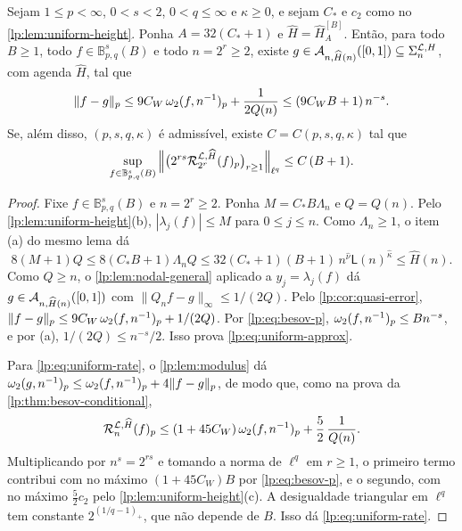 \documentclass[12pt,a4paper]{article}
\begin{document}
\begin{teorema}
\label{lp:thm:uniform}
Sejam $1\le p<\infty$, $0<s<2$, $0<q\le\infty$ e $\kappa\ge0$, e sejam $C_*$ e $c_2$ como no \cref{lp:lem:uniform-height}. Ponha $A=32(C_*+1)$ e $\widehat H=\widehat H^{[B]}_{A}$. Então, para todo $B\ge1$, todo $f\in\mathbb B^s_{p,q}(B)$ e todo $n=2^r\ge2$, existe $g\in\mathcal A_{n,\widehat H(n)}([0,1])\subseteq\Sigma_{n}^{\mathcal L,H}$, com agenda $\widehat H$, tal que
\begin{equation}
 \|f-g\|_p\le9C_W\,\omega_2(f,n^{-1})_{p}+\frac1{2Q(n)}\le(9C_WB+1)\,n^{-s}.
 \label{lp:eq:uniform-approx}
\end{equation}
Se, além disso, $(p,s,q,\kappa)$ é admissível, existe $C=C(p,s,q,\kappa)$ tal que
\begin{equation}
 \sup_{f\in\mathbb B^s_{p,q}(B)}\Big\|\big(2^{rs}\mathcal R^{\mathcal L,\widehat H}_{2^r}(f)_p\big)_{r\ge1}\Big\|_{\ell^q}\le C\,(B+1).
 \label{lp:eq:uniform-rate}
\end{equation}
\end{teorema}

\begin{proof}
Fixe $f\in\mathbb B^s_{p,q}(B)$ e $n=2^r\ge2$. Ponha $M=C_*B\Lambda_n$ e $Q=Q(n)$. Pelo \cref{lp:lem:uniform-height}(b), $|\lambda_j(f)|\le M$ para $0\le j\le n$. Como $\Lambda_n\ge1$, o item (a) do mesmo lema dá
\[
 8(M+1)Q\le8(C_*B+1)\Lambda_nQ\le32(C_*+1)(B+1)\,n^{\hat\nu}\mathsf L(n)^{\hat\kappa}\le\widehat H(n).
\]
Como $Q\ge n$, o \cref{lp:lem:nodal-general} aplicado a $y_j=\lambda_j(f)$ dá $g\in\mathcal A_{n,\widehat H(n)}([0,1])$ com $\|Q_nf-g\|_\infty\le1/(2Q)$. Pelo \cref{lp:cor:quasi-error}, $\|f-g\|_p\le9C_W\,\omega_2(f,n^{-1})_{p}+1/(2Q)$. Por \eqref{lp:eq:besov-p}, $\omega_2(f,n^{-1})_{p}\le Bn^{-s}$, e por (a), $1/(2Q)\le n^{-s}/2$. Isso prova \eqref{lp:eq:uniform-approx}.

Para \eqref{lp:eq:uniform-rate}, o \cref{lp:lem:modulus} dá $\omega_2(g,n^{-1})_{p}\le\omega_2(f,n^{-1})_{p}+4\|f-g\|_p$, de modo que, como na prova da \cref{lp:thm:besov-conditional},
\[
 \mathcal R^{\mathcal L,\widehat H}_{n}(f)_p\le(1+45C_W)\,\omega_2(f,n^{-1})_{p}+\frac52\,\frac1{Q(n)}.
\]
Multiplicando por $n^s=2^{rs}$ e tomando a norma de $\ell^q$ em $r\ge1$, o primeiro termo contribui com no máximo $(1+45C_W)B$ por \eqref{lp:eq:besov-p}, e o segundo, com no máximo $\tfrac52c_2$ pelo \cref{lp:lem:uniform-height}(c). A desigualdade triangular em $\ell^q$ tem constante $2^{(1/q-1)_+}$, que não depende de $B$. Isso dá \eqref{lp:eq:uniform-rate}.
\end{proof}
\end{document}
